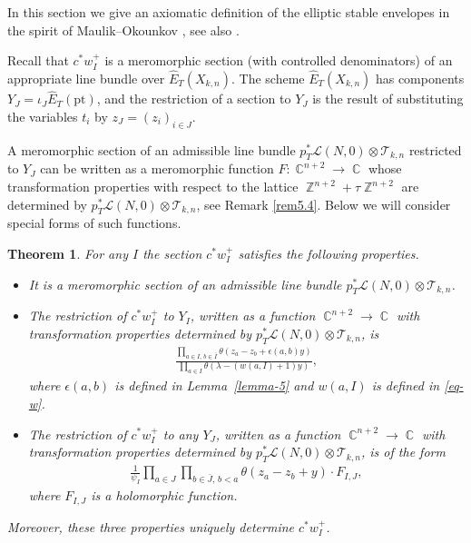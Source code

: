 \documentclass[10pt,a4paper]{amsart}
\numberwithin{equation}{section}
\newtheorem{Theorem}{Theorem}[section]
\DeclareMathOperator\C{\mathbb C}
\DeclareMathOperator\Z{\mathbb Z}
\begin{document}
In this section we give an axiomatic definition of the elliptic stable envelopes in the spirit of Maulik--Okounkov \cite[Section 3.3]{MO}, see also \cite{RTV, RTV2, RV2}.

Recall that $c ^*w^+_I$ is a meromorphic section (with controlled denominators) of an appropriate line bundle over $\hat{E}_T(X_{k,n})$. The scheme $\hat{E}_T(X_{k,n})$ has components $Y_J=\iota_J \hat{E}_T(\mathrm{pt})$, and the restriction of a section to $Y_J$ is the result of substituting the variables $t_i$ by $z_J=(z_i)_{i\in J}$.

A meromorphic section of an admissible line bundle $p_T^*\mathcal L(N,0)\otimes \mathcal T_{k,n}$ restricted to $Y_J$ can be written as a meromorphic function $F\colon \C^{n+2} \to \C$ whose transformation properties with respect to the lattice $\Z^{n+2}+\tau \Z^{n+2}$ are determined by $p_T^*\mathcal L(N,0)\otimes \mathcal T_{k,n}$, see Remark \ref{rem5.4}. Below we will consider special forms of such functions.

\begin{Theorem} \label{thm:axiomatic}For any $I$ the section $c ^*w^+_I$ satisfies the following properties.
\begin{itemize}\itemsep=0pt
\item It is a meromorphic section of an admissible line bundle $p_T^*\mathcal L(N,0)\otimes \mathcal T_{k,n}$.
\item The restriction of $c ^*w^+_I$ to $Y_I$, written as a function $\C^{n+2}\to \C$ with transformation pro\-per\-ties determined by $p_T^*\mathcal L(N,0)\otimes \mathcal T_{k,n}$, is
 \begin{gather*}
 \frac {\prod\limits_{a\in I,\, b\in \bar I}\theta(z_a-z_b+\epsilon(a,b)y)} {\prod\limits_{a\in I}\theta(\lambda-(w(a,I)+1)y)},
 \end{gather*}
where $\epsilon(a,b)$ is defined in Lemma~{\rm \ref{lemma-5}} and $w(a,I)$ is defined in \eqref{eq-w}.
\item The restriction of $c ^*w^+_I$ to any $Y_J$, written as a function $\C^{n+2}\to \C$ with transformation properties determined by $p_T^*\mathcal L(N,0)\otimes \mathcal T_{k,n}$, is of the form
\begin{gather}\label{eqn:horizontal}
\frac{1}{\psi_I} \prod_{a\in J} \prod_{b\in \bar J,\, b<a} \theta(z_a-z_b+y) \cdot F_{I,J},
\end{gather}
where $F_{I,J}$ is a {\em holomorphic} function.
\end{itemize}
Moreover, these three properties uniquely determine $c ^*w^+_I$.
\end{Theorem}
\end{document}
